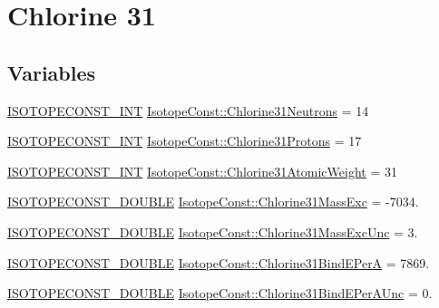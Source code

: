 \hypertarget{group___isotope_const-_chlorine-_cl31}{}\section{Chlorine 31}
\label{group___isotope_const-_chlorine-_cl31}
\subsection*{Variables}
\begin{DoxyCompactItemize}
\item 
\mbox{\hyperlink{group___isotope_const-_macros_ga5f18360b3e99483a35c32d789e62621c}{I\+S\+O\+T\+O\+P\+E\+C\+O\+N\+S\+T\+\_\+\+I\+NT}} \mbox{\hyperlink{group___isotope_const-_chlorine-_cl31_gad310506de90ccd94fe01f77506a05b43}{Isotope\+Const\+::\+Chlorine31\+Neutrons}} = 14
\item 
\mbox{\hyperlink{group___isotope_const-_macros_ga5f18360b3e99483a35c32d789e62621c}{I\+S\+O\+T\+O\+P\+E\+C\+O\+N\+S\+T\+\_\+\+I\+NT}} \mbox{\hyperlink{group___isotope_const-_chlorine-_cl31_ga37ec5aaf682e927a7da090a0e728ada8}{Isotope\+Const\+::\+Chlorine31\+Protons}} = 17
\item 
\mbox{\hyperlink{group___isotope_const-_macros_ga5f18360b3e99483a35c32d789e62621c}{I\+S\+O\+T\+O\+P\+E\+C\+O\+N\+S\+T\+\_\+\+I\+NT}} \mbox{\hyperlink{group___isotope_const-_chlorine-_cl31_ga0b530e8cab21b90c4084438392dbf0c5}{Isotope\+Const\+::\+Chlorine31\+Atomic\+Weight}} = 31
\item 
\mbox{\hyperlink{group___isotope_const-_macros_ga8f45a7272ce02c0b4c65c44636ed719a}{I\+S\+O\+T\+O\+P\+E\+C\+O\+N\+S\+T\+\_\+\+D\+O\+U\+B\+LE}} \mbox{\hyperlink{group___isotope_const-_chlorine-_cl31_gacf69cc29dec9acc6a331e160972676f2}{Isotope\+Const\+::\+Chlorine31\+Mass\+Exc}} = -\/7034.
\item 
\mbox{\hyperlink{group___isotope_const-_macros_ga8f45a7272ce02c0b4c65c44636ed719a}{I\+S\+O\+T\+O\+P\+E\+C\+O\+N\+S\+T\+\_\+\+D\+O\+U\+B\+LE}} \mbox{\hyperlink{group___isotope_const-_chlorine-_cl31_ga70e19be158e4db51e7fe897eaf3fe692}{Isotope\+Const\+::\+Chlorine31\+Mass\+Exc\+Unc}} = 3.
\item 
\mbox{\hyperlink{group___isotope_const-_macros_ga8f45a7272ce02c0b4c65c44636ed719a}{I\+S\+O\+T\+O\+P\+E\+C\+O\+N\+S\+T\+\_\+\+D\+O\+U\+B\+LE}} \mbox{\hyperlink{group___isotope_const-_chlorine-_cl31_ga7b164c581784cdbaf2de9731c08a3008}{Isotope\+Const\+::\+Chlorine31\+Bind\+E\+PerA}} = 7869.
\item 
\mbox{\hyperlink{group___isotope_const-_macros_ga8f45a7272ce02c0b4c65c44636ed719a}{I\+S\+O\+T\+O\+P\+E\+C\+O\+N\+S\+T\+\_\+\+D\+O\+U\+B\+LE}} \mbox{\hyperlink{group___isotope_const-_chlorine-_cl31_ga0b00777c23e635a2aa26bc60db138f0a}{Isotope\+Const\+::\+Chlorine31\+Bind\+E\+Per\+A\+Unc}} = 0.

\end{DoxyCompactItemize}
